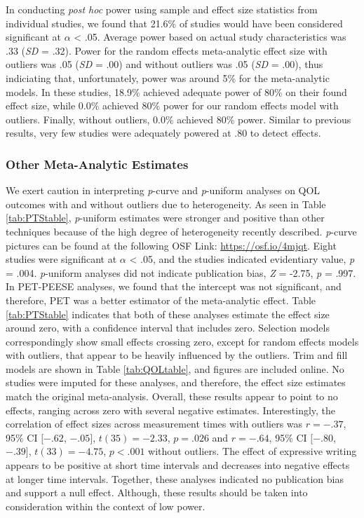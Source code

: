 \documentclass[,man]{apa6}
\begin{document}
In conducting \emph{post hoc} power using sample and effect size statistics from individual studies, we found that 21.6\% of studies would have been considered significant at \(\alpha\) \textless{} .05. Average power based on actual study characteristics was .33 (\emph{SD} = .32). Power for the random effects meta-analytic effect size with outliers was .05 (\emph{SD} = .00) and without outliers was .05 (\emph{SD} = .00), thus indiciating that, unfortunately, power was around 5\% for the meta-analytic models. In these studies, 18.9\% achieved adequate power of 80\% on their found effect size, while 0.0\% achieved 80\% power for our random effects model with outliers. Finally, without outliers, 0.0\% achieved 80\% power. Similar to previous results, very few studies were adequately powered at .80 to detect effects.

\hypertarget{other-meta-analytic-estimates-2}{%
\subsubsection{Other Meta-Analytic Estimates}\label{other-meta-analytic-estimates-2}}

We exert caution in interpreting \emph{p}-curve and \emph{p}-uniform analyses on QOL outcomes with and without outliers due to heterogeneity. As seen in Table \ref{tab:PTStable}, \emph{p}-uniform estimates were stronger and positive than other techniques because of the high degree of heterogeneity recently described. \emph{p}-curve pictures can be found at the following OSF Link: \url{https://osf.io/4mjqt}. Eight studies were significant at \(\alpha\) \textless{} .05, and the studies indicated evidentiary value, \emph{p} = .004. \emph{p}-uniform analyses did not indicate publication bias, \emph{Z} = -2.75, \emph{p} = .997. In PET-PEESE analyses, we found that the intercept was not significant, and therefore, PET was a better estimator of the meta-analytic effect. Table \ref{tab:PTStable} indicates that both of these analyses estimate the effect size around zero, with a confidence interval that includes zero. Selection models correspondingly show small effects crossing zero, except for random effects models with outliers, that appear to be heavily influenced by the outliers. Trim and fill models are shown in Table \ref{tab:QOLtable}, and figures are included online. No studies were imputed for these analyses, and therefore, the effect size estimates match the original meta-analysis. Overall, these results appear to point to no effects, ranging across zero with several negative estimates. Interestingly, the correlation of effect sizes across measurement times with outliers was \(r = -.37\), 95\% CI \([-.62\), \(-.05]\), \(t(35) = -2.33\), \(p = .026\) and \(r = -.64\), 95\% CI \([-.80\), \(-.39]\), \(t(33) = -4.75\), \(p < .001\) without outliers. The effect of expressive writing appears to be positive at short time intervals and decreases into negative effects at longer time intervals. Together, these analyses indicated no publication bias and support a null effect. Although, these results should be taken into consideration within the context of low power.
\newline
\end{document}
